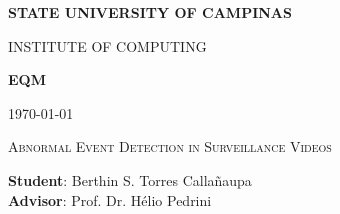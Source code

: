 \documentclass[letterpaper,12pt]{report}
\begin{document}
\thispagestyle{empty}

\begin{center} {\large \bf STATE UNIVERSITY OF CAMPINAS} \end{center}
\begin{center} {\large  INSTITUTE OF COMPUTING} \end{center}
\vspace{1.0cm}
\begin{center} {\large \textbf{EQM}} \end{center}
\begin{center} {\today} \end{center}

\vspace{3.5cm}

\begin{center} {\large {\textsc{{Abnormal Event Detection in Surveillance
Videos}}}}

\vspace{2.0cm}

{\textbf{Student}: Berthin S. Torres Callañaupa \\[0.2cm]
 \textbf{Advisor}: Prof. Dr. Hélio Pedrini
}
\end{center}

\clearpage

\setcounter{page}{1}
\tableofcontents


\setcounter{page}{1}




%




\end{document}
